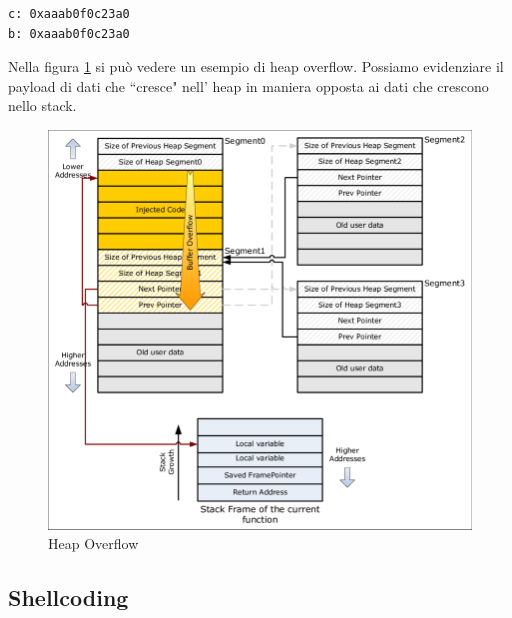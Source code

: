 \begin{verbatim}
c: 0xaaab0f0c23a0
b: 0xaaab0f0c23a0
\end{verbatim}

\newpage

Nella figura \ref{fig:heap} si può vedere un esempio di heap overflow. Possiamo evidenziare il payload di dati che ``cresce" nell' heap in maniera opposta ai dati che crescono nello stack.

\vspace{1cm}
\FloatBarrier
\begin{figure}[!htbp]
    \centering
    \includegraphics[width=1\linewidth]{images/heap-buffer-overflow.png}
    \caption{Heap Overflow}
    \label{fig:heap}
\end{figure}
\FloatBarrier
\vspace{1cm}

\subsection*{Shellcoding}

